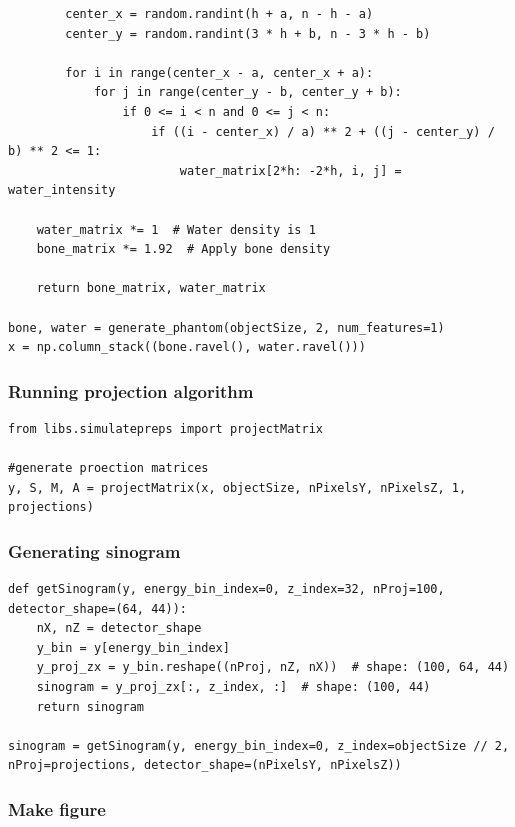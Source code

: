 \begin{verbatim}
        center_x = random.randint(h + a, n - h - a)
        center_y = random.randint(3 * h + b, n - 3 * h - b)
                        
        for i in range(center_x - a, center_x + a):
            for j in range(center_y - b, center_y + b):
                if 0 <= i < n and 0 <= j < n:
                    if ((i - center_x) / a) ** 2 + ((j - center_y) / b) ** 2 <= 1:
                        water_matrix[2*h: -2*h, i, j] = water_intensity

    water_matrix *= 1  # Water density is 1
    bone_matrix *= 1.92  # Apply bone density
    
    return bone_matrix, water_matrix

bone, water = generate_phantom(objectSize, 2, num_features=1)
x = np.column_stack((bone.ravel(), water.ravel()))
\end{verbatim}

\subsubsection{Running projection algorithm}

\begin{verbatim}
from libs.simulatepreps import projectMatrix

#generate proection matrices
y, S, M, A = projectMatrix(x, objectSize, nPixelsY, nPixelsZ, 1, projections)
\end{verbatim}

\subsubsection{Generating sinogram}

\begin{verbatim}
def getSinogram(y, energy_bin_index=0, z_index=32, nProj=100, detector_shape=(64, 44)):  
    nX, nZ = detector_shape
    y_bin = y[energy_bin_index]
    y_proj_zx = y_bin.reshape((nProj, nZ, nX))  # shape: (100, 64, 44)
    sinogram = y_proj_zx[:, z_index, :]  # shape: (100, 44)
    return sinogram

sinogram = getSinogram(y, energy_bin_index=0, z_index=objectSize // 2, nProj=projections, detector_shape=(nPixelsY, nPixelsZ))
\end{verbatim}

\subsubsection{Make figure}

